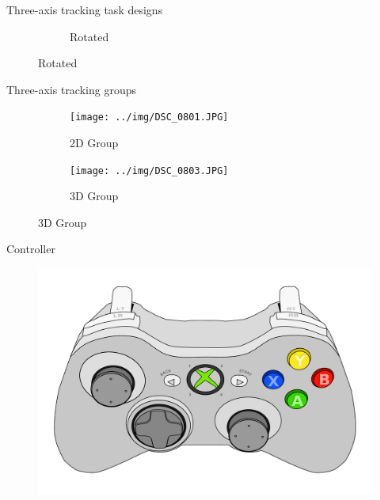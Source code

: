 \documentclass[10pt]{beamer}
\begin{document}
\begin{frame}[fragile]{Three-axis tracking task designs}
\begin{figure}
\begin{center}
\begin{subfigure}{0.45\linewidth}
        \caption{Rotated}
      \end{subfigure}
    \end{center}
  \end{figure}
\end{frame}

\begin{frame}[fragile]{Three-axis tracking groups}
  \begin{figure}
    \begin{center}
      \begin{subfigure}{0.49\textwidth}
        \texttt{[image: ../img/DSC\_0801.JPG]}
        \caption{2D Group}
      \end{subfigure}\hfill
      \begin{subfigure}{0.49\textwidth}
        \texttt{[image: ../img/DSC\_0803.JPG]}
        \caption{3D Group}
      \end{subfigure}
    \end{center}
  \end{figure}
\end{frame}

\begin{frame}[fragile]{Controller}
  \begin{figure}[h!]
    \begin{center}
      \includegraphics[width=0.75\linewidth]{../img/Xbox_Controller.pdf}
    \end{center}
  \end{figure}
\end{frame}
\end{document}
